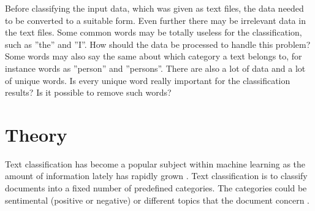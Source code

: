 Before classifying the input data, which was given as text files, the data needed to be
converted to a suitable form. Even further there may be irrelevant data
in the text files. Some common words may be totally useless for the classification,
such as ''the'' and ''I''. How should the data be processed to handle this
problem? Some words may also say the same about which category a text belongs to, for instance
words as ''person'' and ''persons''. There are also a lot of data and  a lot of
unique words. Is every unique word really important for the classification
results? Is it possible to remove such words?



\section{Theory}
Text classification has become a popular subject within machine learning as the amount of information lately has rapidly grown \citep{joachims}. Text classification is to
classify documents into a fixed number of predefined categories. The categories
could be sentimental (positive or negative) or different topics that the
document concern \cite{ngrams_ai}.


